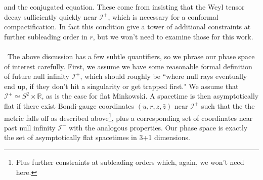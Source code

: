 \documentclass[11pt,letterpaper]{article}
\newcommand{\mc}[1]{\mathcal{#1}}
\newcommand{\R}{\mathbb{R}}
\begin{document}
and the conjugated equation. These come from insisting that the Weyl tensor decay sufficiently quickly near $\mc{I}^+$, which is necessary for a conformal compactification. In fact this condition give a tower of additional constraints at further subleading order in $r$, but we won't need to examine those for this work.\\
\\
\
The above discussion has a few subtle quantifiers, so we phrase our phase space of interest carefully. First, we assume we have some reasonable formal definition of future null infinity $\mc{I}^+$, which should roughly be ``where null rays eventually end up, if they don't hit a singularity or get trapped first." We assume that $\mc{I}^+ \simeq S^2 \times \R$, as is the case for flat Minkowski. A spacetime is then asymptotically flat if there exist Bondi-gauge coordinates $(u,r,z, \bar{z})$ near $\mc{I}^+$ such that the the metric falls off as described above\footnote{Plus further constraints at subleading orders which, again, we won't need here.}, plus a corresponding set of coordinates near past null infinity $\mc{I}^-$ with the analogous properties. Our phase space is exactly the set of asymptotically flat spacetimes in 3+1 dimensions. 
\end{document}
